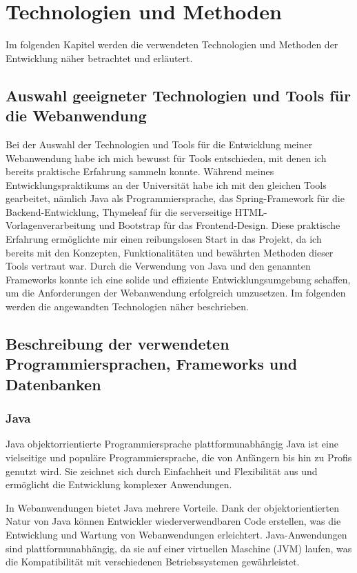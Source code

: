 \documentclass[fontsize=12pt,openright,oneside,paper=a4,BCOR=1cm]{scrbook}
\begin{document}
%
%
\renewcommand{\cleardoublepage}{}
\chapter{Technologien und Methoden}

Im folgenden Kapitel werden die verwendeten Technologien und Methoden der Entwicklung näher betrachtet und erläutert.

\section{Auswahl geeigneter Technologien und Tools für die Webanwendung}


Bei der Auswahl der Technologien und Tools für die Entwicklung meiner Webanwendung habe ich mich bewusst für Tools entschieden, mit denen ich bereits praktische Erfahrung sammeln konnte. Während meines Entwicklungspraktikums an der Universität habe ich mit den gleichen Tools gearbeitet, nämlich Java als Programmiersprache, das Spring-Framework für die Backend-Entwicklung, Thymeleaf für die serverseitige HTML-Vorlagenverarbeitung und Bootstrap für das Frontend-Design. Diese praktische Erfahrung ermöglichte mir einen reibungslosen Start in das Projekt, da ich bereits mit den Konzepten, Funktionalitäten und bewährten Methoden dieser Tools vertraut war. Durch die Verwendung von Java und den genannten Frameworks konnte ich eine solide und effiziente Entwicklungsumgebung schaffen, um die Anforderungen der Webanwendung erfolgreich umzusetzen.
Im folgenden werden die angewandten Technologien näher beschrieben.

\section{Beschreibung der verwendeten Programmiersprachen, Frameworks und Datenbanken}

\subsection{Java}
Java objektorrientierte Programmiersprache 
plattformunabhängig
Java ist eine vielseitige und populäre Programmiersprache, die von Anfängern bis hin zu Profis genutzt wird. Sie zeichnet sich durch Einfachheit und Flexibilität aus und ermöglicht die Entwicklung komplexer Anwendungen.

In Webanwendungen bietet Java mehrere Vorteile. Dank der objektorientierten Natur von Java können Entwickler wiederverwendbaren Code erstellen, was die Entwicklung und Wartung von Webanwendungen erleichtert. Java-Anwendungen sind plattformunabhängig, da sie auf einer virtuellen Maschine (JVM) laufen, was die Kompatibilität mit verschiedenen Betriebssystemen gewährleistet.
\end{document}
